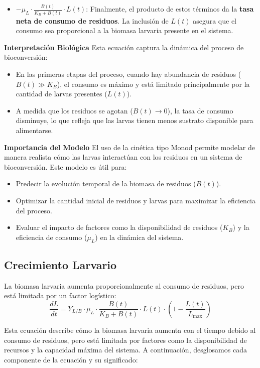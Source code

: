\documentclass[12pt]{article}
\begin{document}
\begin{itemize}
    \item $-\mu_L \cdot \frac{B(t)}{K_B + B(t)} \cdot L(t)$: Finalmente, el producto de estos términos da la \textbf{tasa neta de consumo de residuos}. La inclusión de $L(t)$ asegura que el consumo sea proporcional a la biomasa larvaria presente en el sistema.
\end{itemize}

\textbf{Interpretación Biológica}
Esta ecuación captura la dinámica del proceso de bioconversión:
\begin{itemize}
    \item En las primeras etapas del proceso, cuando hay abundancia de residuos ($B(t) \gg K_B$), el consumo es máximo y está limitado principalmente por la cantidad de larvas presentes ($L(t)$).
    \item A medida que los residuos se agotan ($B(t) \to 0$), la tasa de consumo disminuye, lo que refleja que las larvas tienen menos sustrato disponible para alimentarse.
\end{itemize}

\textbf{Importancia del Modelo}
El uso de la cinética tipo Monod permite modelar de manera realista cómo las larvas interactúan con los residuos en un sistema de bioconversión. Este modelo es útil para:
\begin{itemize}
    \item Predecir la evolución temporal de la biomasa de residuos ($B(t)$).
    \item Optimizar la cantidad inicial de residuos y larvas para maximizar la eficiencia del proceso.
    \item Evaluar el impacto de factores como la disponibilidad de residuos ($K_B$) y la eficiencia de consumo ($\mu_L$) en la dinámica del sistema.
\end{itemize}

\subsection{Crecimiento Larvario}
La biomasa larvaria aumenta proporcionalmente al consumo de residuos, pero está limitada por un factor logístico:
\begin{equation}
    \frac{dL}{dt} = Y_{L/B} \cdot \mu_L \cdot \frac{B(t)}{K_B + B(t)} \cdot L(t) \cdot \left(1 - \frac{L(t)}{L_{\text{max}}}\right)
\end{equation}

Esta ecuación describe cómo la biomasa larvaria aumenta con el tiempo debido al consumo de residuos, pero está limitada por factores como la disponibilidad de recursos y la capacidad máxima del sistema. A continuación, desglosamos cada componente de la ecuación y su significado:
\end{document}
